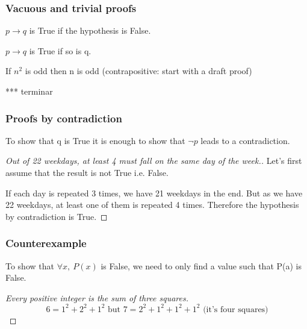 \documentclass[12pt, a4paper]{book}
\begin{document}
\subsubsection*{Vacuous and trivial proofs}
$p \rightarrow q$ is True if the hypothesis is False.

$p \rightarrow q$ is True if so is q.

\begin{exmp}
    If $n^2$ is odd then n is odd (contrapositive: start with a draft proof)

    *** terminar
\end{exmp}

\subsubsection*{Proofs by contradiction}

To show that q is True it is enough to show that $\lnot p$ leads to a contradiction.

\begin{exmp}

    \begin{proof}[Out of 22 weekdays, at least 4 must fall on the same day of the week.]    

    Let's first assume that the result is not True i.e. False. 

    If each day is repeated 3 times, we have 21 weekdays in the end. But as we have 22 weekdays, at least one of them is repeated 4 times. Therefore the hypothesis by contradiction is True.

    \end{proof}
\end{exmp}

\subsubsection*{Counterexample}
To show that $\forall x, \ P(x)$ is False, we need to only find a value such that P(a) is False.

\begin{exmp}
    \begin{proof}[Every positive integer is the sum of three squares]
    $$6=1^2+2^2+1^2 \text{ but } 7= 2^2+1^2+1^2+1^2 \text{ (it's four squares)} $$
    \end{proof}

\end{exmp}
\end{document}
